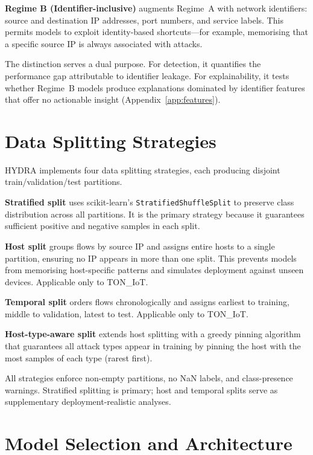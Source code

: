 \documentclass[12pt,a4paper]{report}
\begin{document}
\textbf{Regime B (Identifier-inclusive)} augments Regime~A with network identifiers: source and destination IP addresses, port numbers, and service labels. This permits models to exploit identity-based shortcuts---for example, memorising that a specific source IP is always associated with attacks.

The distinction serves a dual purpose. For detection, it quantifies the performance gap attributable to identifier leakage. For explainability, it tests whether Regime~B models produce explanations dominated by identifier features that offer no actionable insight (Appendix~\ref{app:features}).

\section{Data Splitting Strategies}
\label{sec:splitting}

HYDRA implements four data splitting strategies, each producing disjoint train/validation/test partitions.

\textbf{Stratified split} uses scikit-learn's \texttt{StratifiedShuffleSplit} to preserve class distribution across all partitions. It is the primary strategy because it guarantees sufficient positive and negative samples in each split.

\textbf{Host split} groups flows by source IP and assigns entire hosts to a single partition, ensuring no IP appears in more than one split. This prevents models from memorising host-specific patterns and simulates deployment against unseen devices. Applicable only to TON\_IoT.

\textbf{Temporal split} orders flows chronologically and assigns earliest to training, middle to validation, latest to test. Applicable only to TON\_IoT.

\textbf{Host-type-aware split} extends host splitting with a greedy pinning algorithm that guarantees all attack types appear in training by pinning the host with the most samples of each type (rarest first).

All strategies enforce non-empty partitions, no NaN labels, and class-presence warnings. Stratified splitting is primary; host and temporal splits serve as supplementary deployment-realistic analyses.

\section{Model Selection and Architecture}
\label{sec:models}
\end{document}

